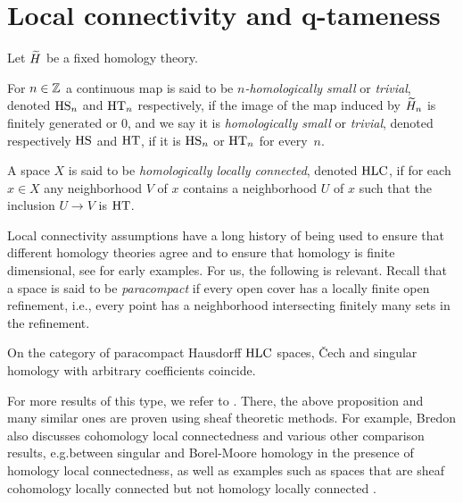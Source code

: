 
\section{Local connectivity and q-tameness} \label{s:connectivity}

Let $\widetilde{H}$ be a fixed homology theory.

\begin{defi} \label{defi:local_connectedness}
	For $n \in \mathbb{Z}$ a continuous map is said to be \textit{$n$-homologically small} or \textit{trivial}, denoted $\mathrm{HS}_n$ and $\mathrm{HT}_n$ respectively, if the image of the map induced by $\widetilde{H}_n$ is finitely generated or 0, and we say it is \textit{homologically small} or \textit{trivial}, denoted respectively $\mathrm{HS}$ and $\mathrm{HT}$, if it is $\mathrm{HS}_n$ or $\mathrm{HT}_n$ for every~$n$.
\end{defi}

\begin{defi}
	A space $X$ is said to be \emph{homologically locally connected}, denoted $\mathrm{HLC}$, if for each $x \in X$ any neighborhood $V$ of $x$ contains a neighborhood $U$ of $x$ such that the inclusion $U \to V$ is $\mathrm{HT}$.
\end{defi}

Local connectivity assumptions have a long history of being used to ensure that different homology theories agree and to ensure that homology is finite dimensional, see \cite{MR0007094} for early examples.
For us, the following is relevant.
Recall that a space is said to be \textit{paracompact} if every open cover has a locally finite open refinement, i.e., every point has a neighborhood intersecting finitely many sets in the refinement.

\begin{prop}[{\cite{MR105677, MR1481706}}] \label{prop:cech_sing_hom_hlc}
	On the category of paracompact Hausdorff $\mathrm{HLC}$ spaces, \v{C}ech and singular homology with arbitrary coefficients coincide.
\end{prop}

For more results of this type, we refer to \cite{MR1481706}. There, the above proposition \cite[Corollary VI.12.6]{MR1481706} and many similar ones are proven using sheaf theoretic methods.
For example, Bredon also discusses cohomology local connectedness \cite[Section II.17]{MR1481706} and various other comparison results, e.g.\@ between singular and Borel-Moore homology \cite[Corollary V.12.15]{MR1481706} in the presence of homology local connectedness, as well as examples such as spaces that are sheaf cohomology locally connected but not homology locally connected \cite[Example II.17.12]{MR1481706}.


